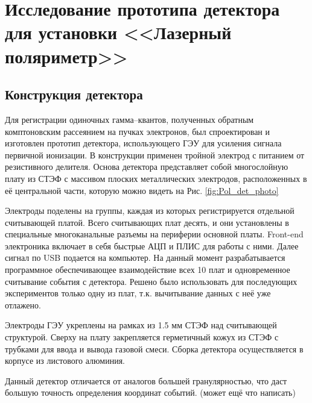 \chapter{Исследование прототипа детектора для установки <<Лазерный поляриметр>>}
\label{sec:pol_examine}
\section{Конструкция детектора}
Для регистрации одиночных гамма--квантов, полученных обратным комптоновским рассеянием на пучках электронов, был спроектирован и изготовлен прототип детектора, использующего ГЭУ для усиления сигнала первичной ионизации. В конструкции применен тройной электрод с питанием от резистивного делителя. Основа детектора представляет собой многослойную плату из СТЭФ с массивом плоских металлических электродов, расположенных в её центральной части, которую можно видеть на Рис. \ref{fig:Pol_det_photo} 
\par Электроды поделены на группы, каждая из которых регистрируется отдельной считывающей платой. Всего считывающих плат десять, и они установлены в специальные многоканальные разъемы на периферии основной платы. Front-end электроника включает в себя быстрые АЦП и ПЛИС для работы с ними. Далее сигнал по USB подается на компьютер. На данный момент разрабатывается программное обеспечивающее взаимодействие всех 10 плат и одновременное считывание события с детектора. Решено было использовать для последующих экспериментов только одну из плат, т.к. вычитывание данных с неё уже отлажено. 
\par Электроды ГЭУ укреплены на рамках из 1.5 мм СТЭФ над считывающей структурой. Сверху на плату закрепляется герметичный кожух из СТЭФ с трубками для ввода и вывода газовой смеси. Сборка детектора осуществляется в корпусе из листового алюминия.
\par Данный детектор отличается от аналогов большей гранулярностью, что даст большую точность определения координат событий. (может ещё что написать)
